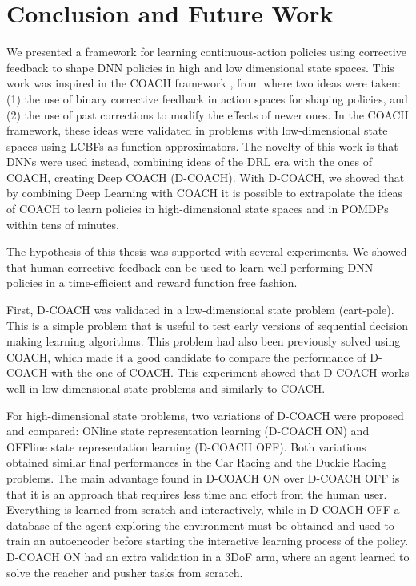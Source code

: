\chapter{Conclusion and Future Work}
We presented a framework for learning continuous-action policies using corrective feedback to shape DNN policies in high and low dimensional state spaces. This work was inspired in the COACH framework \cite{Celemin2018AnInteractive}, from where two ideas were taken: (1) the use of binary corrective feedback in action spaces for shaping policies, and (2) the use of past corrections to modify the effects of newer ones. In the COACH framework, these ideas were validated in problems with low-dimensional state spaces using LCBFs as function approximators. The novelty of this work is that DNNs were used instead, combining ideas of the DRL era with the ones of COACH, creating Deep COACH (D-COACH). With D-COACH, we showed that by combining Deep Learning with COACH it is possible to extrapolate the ideas of COACH to learn policies in high-dimensional state spaces and in POMDPs within tens of minutes. 

The hypothesis of this thesis was supported with several experiments. We showed that human corrective feedback can be used to learn well performing DNN policies in a time-efficient and reward function free fashion.

First, D-COACH was validated in a low-dimensional state problem (cart-pole). This is a simple problem that is useful to test early versions of sequential decision making learning algorithms. This problem had also been previously solved using COACH, which made it a good candidate to compare the performance of D-COACH with the one of COACH. This experiment showed that D-COACH works well in low-dimensional state problems and similarly to COACH. 

For high-dimensional state problems, two variations of D-COACH were proposed and compared: ONline state representation learning (D-COACH ON) and OFFline state representation learning (D-COACH OFF). Both variations obtained similar final performances in the Car Racing and the Duckie Racing problems. The main advantage found in D-COACH ON over D-COACH OFF is that it is an approach that requires less time and effort from the human user. Everything is learned from scratch and interactively, while in D-COACH OFF a database of the agent exploring the environment must be obtained and used to train an autoencoder before starting the interactive learning process of the policy. D-COACH ON had an extra validation in a 3DoF arm, where an agent learned to solve the reacher and pusher tasks from scratch.

